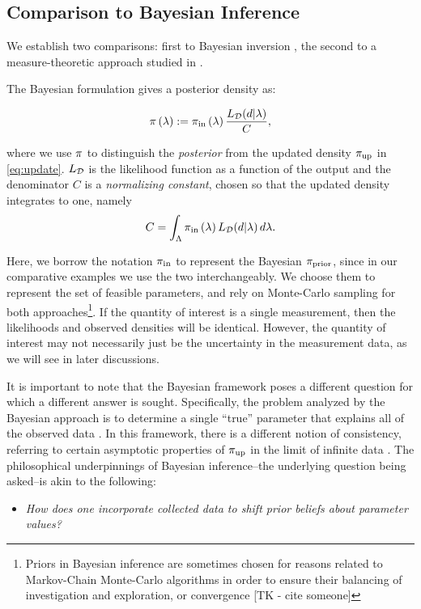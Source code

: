 
\subsection{Comparison to Bayesian Inference}\label{sec:othermethods}
We establish two comparisons: first to Bayesian inversion \cite{Walpole, Berger, Complete, Smith}, the second to a measure-theoretic approach studied in \cite{BET+14, BE13}. 


The Bayesian formulation gives a posterior density as:

\begin{equation}\label{eq:sb_post}
    \pi\left ( \lambda \right ) := \operatorname*{\pi_{in}}\left ( \lambda \right ) \frac{L_{\mathcal{D}} (d | \lambda)}{ C },
\end{equation}

where we use $\pi$ to distinguish the \emph{posterior} from the updated density $\operatorname*{\pi_{up}}$ in \eqref{eq:update}.
$L_{\mathcal{D}}$ is the likelihood function as a function of the output and the denominator $C$ is a \emph{normalizing constant}, chosen so that the updated density integrates to one, namely
\[
C = \int_{\Lambda} \operatorname*{\pi_{in}}\left ( \lambda \right ) L_{\mathcal{D}}(d | \lambda) \, d\lambda.
\]

Here, we borrow the notation $\operatorname*{\pi_{in}}$ to represent the Bayesian $\pi_\text{prior}$, since in our comparative examples we use the two interchangeably.
We choose them to represent the set of feasible parameters, and rely on Monte-Carlo sampling for both approaches\footnote{Priors in Bayesian inference are sometimes chosen for reasons related to Markov-Chain Monte-Carlo algorithms in order to ensure their balancing of investigation and exploration, or convergence [TK - cite someone]}.
If the quantity of interest is a single measurement, then the likelihoods and observed densities will be identical.
However, the quantity of interest may not necessarily just be the uncertainty in the measurement data, as we will see in later discussions. 

It is important to note that the Bayesian framework poses a different question for which a different answer is sought.
Specifically, the problem analyzed by the Bayesian approach is to determine a single ``true'' parameter that explains all of the observed data \cite{Smith, Concrete, Complete}.
In this framework, there is a different notion of consistency, referring to certain asymptotic properties of $\operatorname*{\pi_{up}}$ in the limit of infinite data \cite{Barron, Silverman}.
The philosophical underpinnings of Bayesian inference\---the underlying question being asked\---is akin to the following:
\begin{itemize}
  \item \emph{How does one incorporate collected data to shift prior beliefs about parameter values?}
\end{itemize}

